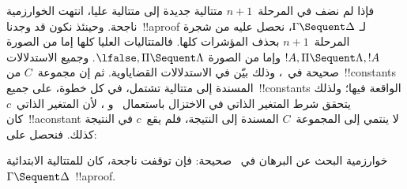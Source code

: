 \documentclass[../../../include/open-logic-section]{subfiles}
\begin{document}
فإذا لم نضف في المرحلة~$n+1$ متتالية جديدة إلى متتالية عليا، انتهت
الخوارزمية ناجحة. وحينئذ نكون قد وجدنا~!!a{proof} لـ
$\Gamma\Sequent\Delta$، نحصل عليه من شجرة المرحلة~$n+1$ بحذف المؤشرات
كلها. فالمتتاليات العليا كلها إما من الصورة
$!A,\Pi\Sequent\Lambda,!A$ وإما من الصورة
$\lfalse,\Pi\Sequent\Lambda$. وجميع الاستدلالات صحيحة في~،
وذلك بيّن في الاستدلالات القضاياوية. ثم إن مجموعة~$C$ من~!!{constant}s
المسندة إلى متتالية تشتمل، في كل خطوة، على جميع~!!{constant}s الواقعة
فيها؛ ولذلك يتحقق
شرط المتغير الذاتي في الاختزال باستعمال~\LeftR{\lexists} و
\RightR{\lforall}، لأن المتغير الذاتي~$c$ كان~!!a{constant} لا ينتمي إلى
المجموعة~$C$ المسندة إلى النتيجة، فلم يقع~$c$ في النتيجة كذلك. فنحصل على:

\begin{prop}
خوارزمية البحث عن البرهان في~ صحيحة: فإن توقفت ناجحة، كان
للمتتالية الابتدائية~$\Gamma\Sequent\Delta$~!!a{proof}.
\end{prop}
\end{document}
